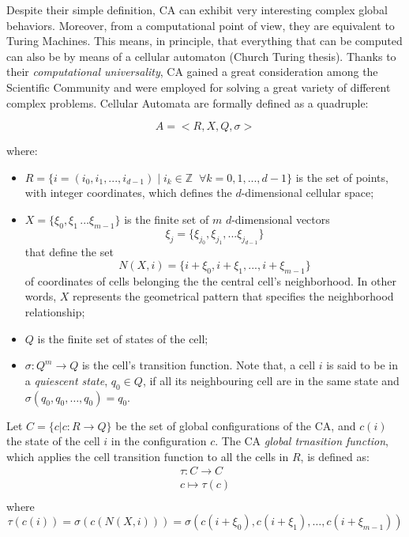     Despite their simple definition, CA can exhibit very interesting
    complex global behaviors. Moreover, from a computational point of
    view, they are equivalent to Turing Machines. This means, in
    principle, that everything that can be computed can also be by
    means of a cellular automaton (Church Turing thesis). Thanks to
    their \emph{computational universality}, CA gained a great
    consideration among the Scientific Community and were employed for
    solving a great variety of different complex problems. Cellular
    Automata are formally defined as a quadruple:

    $$A = <R,X,Q,\sigma>$$

    \noindent where:

    \begin{itemize}
    \item $R = \{i = (i_0,i_1,...,i_{d-1}) \; | \; i_k \in \mathbb{Z} \;\; \forall k =
      0,1,...,d-1\}$ is the set of points, with integer coordinates, which
      defines the $d$-dimensional cellular space;

    \item $X = \{\xi_0,\xi_1\,...\xi_{m-1}\}$ is the finite set of $m$
      $d$-dimensional vectors
      \[ \xi_j = \{\xi_{j_0},\xi_{j_1},...\xi_{j_{d-1}}\} \]
      that define the set
      \[ N(X,i) = \{i + \xi_0,i + \xi_1,...,i + \xi_{m-1}\} \]
      of coordinates of cells belonging the the central cell's
      neighborhood. In other words, $X$ represents the geometrical
      pattern that specifies the neighborhood relationship;

    \item $Q$ is the finite set of states of the cell;

    \item $\sigma : Q^m \rightarrow Q$ is the cell's transition
      function. Note that, a cell $i$ is said to be in a
      \emph{quiescent state}, $q_0 \in Q$, if all its neighbouring
      cell are in the same state and $\sigma(q_0, q_0, \ldots, q_0) = q_0$.

    \end{itemize}
    
    Let $C = \{ c | c: R \rightarrow Q \}$ be the set of global
    configurations of the CA, and $c(i)$ the state of the cell $i$ in
    the configuration $c$. The CA \emph{global trnasition function},
    which applies the cell transition function to all the cells in
    $R$, is defined as:
    $$
    \begin{array}{r}
      \tau : C \longrightarrow C \\
      c \mapsto \tau(c) \\
    \end{array}
    $$
    where
    $$
    \tau(c(i)) = \sigma(c(N(X, i))) = \sigma(c(i + \xi_0), c(i + \xi_1), \ldots, c(i + \xi_{m-1}))
    $$

